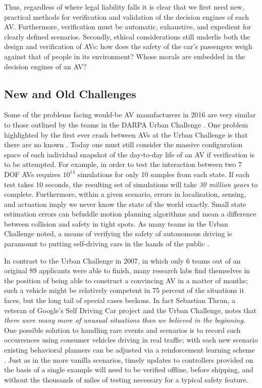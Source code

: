  Thus, regardless of where legal liability falls it is clear that we first need new, practical methods for verification and validation of the decision engines of each AV.
 Furthermore, verification must be automatic, exhaustive, and expedient for clearly defined scenarios. 
 Secondly, ethical considerations still underlie both the design and verification of AVs: how does the safety of the car's passengers weigh against that of people in its environment? 
 Whose morals are embedded in the decision engines of an AV?
 
 \subsection{New and Old Challenges}
 
 Some of the problems facing would-be AV manufacturers in 2016 are very similar to those outlined by the teams in the DARPA Urban Challenge \cite{buehler2009darpa}. One problem highlighted by the first ever crash between AVs at the Urban Challenge \cite{fletcher2008cornell} is that there are no known  \cite{urmson2008autonomous}.  Today one must still consider the massive configuration space of each individual snapshot of the day-to-day life of an AV if verification is to be attempted. For example, in order to test the interaction between two 7 DOF AVs requires $10^{14}$ simulations for only 10 samples from each state. If each test takes 10 seconds, the resulting set of simulations will take \emph{30 million years} to complete. Furthermore, within a given scenario, errors in localization, sensing, and actuation imply we never know the state of the world exactly. Small state estimation errors can befuddle motion planning algorithms and mean a difference between collision and safety in tight spots. As many teams in the Urban Challenge noted, a means of verifying the safety of autonomous driving is paramount to putting self-driving cars in the hands of the public \cite{urmson2008autonomous}. 
 
 In contrast to the Urban Challenge in 2007, in which only 6 teams out of an original 89 applicants were able to finish, many research labs find themselves in the position of being able to construct a convincing AV in a matter of months; such a vehicle might be relatively competent in 75 percent of the situations it faces, but the long tail of special cases beckons. In fact Sebastian Thrun, a veteran of Google's Self Driving Car project and the Urban Challenge, notes that \emph{there were many more of unusual situations than we believed in the beginning}. One possible solution to handling rare events and scenarios is to record such occurrences using consumer vehicles driving in real traffic; with each new scenario existing behavioral planners can be adjusted via a reinforcement learning scheme \cite{wei2013autonomous, Silver_2010, Waldrop2015}. Just as in the more vanilla scenarios, timely updates to controllers provided on the basis of a single example will need to be verified offline, before shipping, and without the thousands of miles of testing necessary for a typical safety feature. 
 
